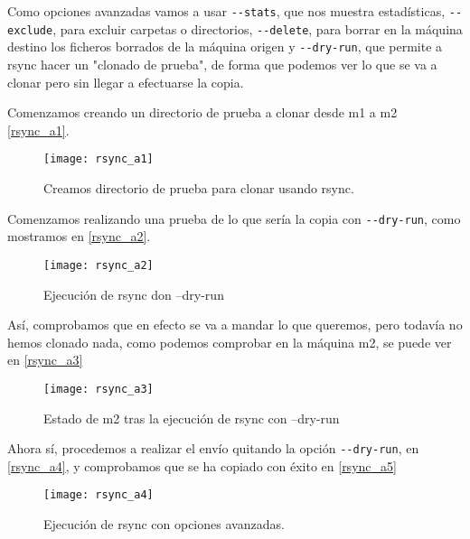 Como opciones avanzadas vamos a usar \verb|--stats|, que nos muestra estadísticas, \verb|--exclude|, para excluir carpetas o directorios, \verb|--delete|, para borrar en la máquina destino los ficheros borrados de la máquina origen y \verb|--dry-run|, que permite a rsync hacer un "clonado de prueba", de forma que podemos ver lo que se va a clonar pero sin llegar a efectuarse la copia.

Comenzamos creando un directorio de prueba a clonar desde m1 a m2 \eqref{rsync_a1}.

\begin{figure}
\begin{center}
\caption{Creamos directorio de prueba para clonar usando rsync.}
\label{rsync_a1}
\texttt{[image: rsync\_a1]}
\end{center}
\end{figure}

Comenzamos realizando una prueba de lo que sería la copia con \verb|--dry-run|, como mostramos en \eqref{rsync_a2}.

\begin{figure}
\begin{center}
\caption{Ejecución de rsync don --dry-run}
\label{rsync_a2}
\texttt{[image: rsync\_a2]}
\end{center}
\end{figure}

Así, comprobamos que en efecto se va a mandar lo que queremos, pero todavía no hemos clonado nada, como podemos comprobar en la máquina m2, se puede ver en \eqref{rsync_a3}

\begin{figure}
\begin{center}
\caption{Estado de m2 tras la ejecución de rsync con --dry-run}
\label{rsync_a3}
\texttt{[image: rsync\_a3]}
\end{center}
\end{figure}

Ahora sí, procedemos a realizar el envío quitando la opción \verb|--dry-run|, en \eqref{rsync_a4}, y comprobamos que se ha copiado con éxito en \eqref{rsync_a5}

\begin{figure}
\begin{center}
\caption{Ejecución de rsync con opciones avanzadas.}
\label{rsync_a4}
\texttt{[image: rsync\_a4]}
\end{center}
\end{figure}

